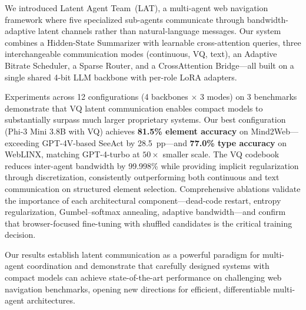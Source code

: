 \documentclass{article}
\newcommand{\ours}{\textsc{LAT}}
\begin{document}
We introduced Latent Agent Team~(\ours{}), a multi-agent web navigation framework where five specialized sub-agents communicate through bandwidth-adaptive latent channels rather than natural-language messages.
Our system combines a Hidden-State Summarizer with learnable cross-attention queries, three interchangeable communication modes (continuous, VQ, text), an Adaptive Bitrate Scheduler, a Sparse Router, and a CrossAttention Bridge---all built on a single shared 4-bit LLM backbone with per-role LoRA adapters.

Experiments across 12 configurations (4 backbones $\times$ 3 modes) on 3 benchmarks demonstrate that VQ latent communication enables compact models to substantially surpass much larger proprietary systems.
Our best configuration (Phi-3 Mini 3.8B with VQ) achieves \textbf{81.5\% element accuracy} on Mind2Web---exceeding GPT-4V-based SeeAct by 28.5~pp---and \textbf{77.0\% type accuracy} on WebLINX, matching GPT-4-turbo at $50\times$ smaller scale.
The VQ codebook reduces inter-agent bandwidth by 99.998\% while providing implicit regularization through discretization, consistently outperforming both continuous and text communication on structured element selection.
Comprehensive ablations validate the importance of each architectural component---dead-code restart, entropy regularization, Gumbel--softmax annealing, adaptive bandwidth---and confirm that browser-focused fine-tuning with shuffled candidates is the critical training decision.

Our results establish latent communication as a powerful paradigm for multi-agent coordination and demonstrate that carefully designed systems with compact models can achieve state-of-the-art performance on challenging web navigation benchmarks, opening new directions for efficient, differentiable multi-agent architectures.
\end{document}
